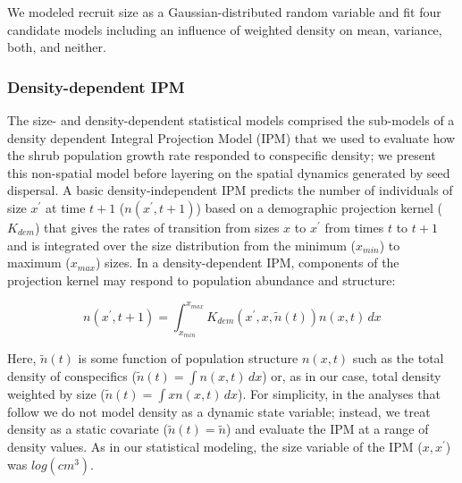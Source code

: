 \documentclass[11pt]{article}\usepackage[]{graphicx}\usepackage[]{color}
\begin{document}
We modeled recruit size as a Gaussian-distributed random variable and fit four candidate models including an influence of weighted density on mean, variance, both, and neither. 

\subsubsection*{Density-dependent IPM}
The size- and density-dependent statistical models comprised the sub-models of a density dependent Integral Projection Model (IPM) that we used to evaluate how the shrub population growth rate responded to conspecific density; we present this non-spatial model before layering on the spatial dynamics generated by seed dispersal. 
A basic density-independent IPM predicts the number of individuals of size $x^\prime$ at time $t+1$ ($n(x^\prime,t + 1)$) based on a demographic projection kernel ($K_{dem}$) that gives the rates of transition from sizes $x$ to $x^\prime$ from times $t$ to $t+1$ and is integrated over the size distribution from the minimum ($x_{min}$) to maximum ($x_{max}$) sizes. In a density-dependent IPM, components of the projection kernel may respond to population abundance and structure:
\begin{linenomath*} 
\begin{equation} \label{eq:DDIPM}
n(x^\prime,t + 1) = \int_{x_{min}}^{x_{max}} K_{dem}(x^\prime,x,\tilde{n}(t)) n(x,t) \,dx 
\end{equation} 
\end{linenomath*}
Here, $\tilde{n}(t)$ is some function of population structure $n(x,t)$ such as the total density of conspecifics ($\tilde{n}(t)=\int n(x,t) \,dx$) or, as in our case, total density weighted by size ($\tilde{n}(t)=\int x n(x,t) \,dx$). 
For simplicity, in the analyses that follow we do not model density as a dynamic state variable; instead, we treat density as a static covariate ($\tilde{n}(t)=\tilde{n}$) and evaluate the IPM at a range of density values. 
As in our statistical modeling, the size variable of the IPM ($x,x^\prime$) was $log(cm^3)$.
\end{document}
